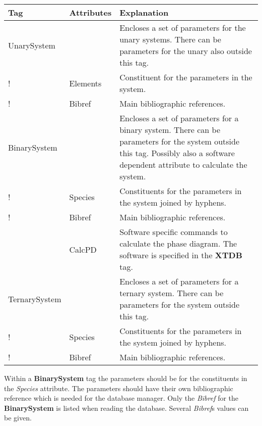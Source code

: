 \documentclass{article}
\begin{document}
\bigskip
\begin{tabular}{|p{} p{} p{}|}\hline
  Tag & Attributes &  Explanation\\\hline

  UnarySystem  && Encloses a set of parameters for the unary systems.
          There can be parameters for the unary also outside this tag.\\
!          & Elements & Constituent for the parameters in the system.\\
!          & Bibref & Main bibliographic references.\\\hline

  BinarySystem  && Encloses a set of parameters for a binary system.
          There can be parameters for the system outside this tag.  Possibly
          also a software dependent attribute to calculate the system.\\
!          & Species & Constituents for the parameters in the system joined
                       by hyphens.\\
!          & Bibref & Main bibliographic references.\\
          & CalcPD & Software specific commands to calculate the
                       phase diagram.  The software is specified in the
                       {\bf XTDB} tag.\\\hline

  TernarySystem  && Encloses a set of parameters for a ternary system.
          There can be parameters for the system outside this tag.\\
!          & Species & Constituents for the parameters in the system joined
                       by hyphens.\\
!          & Bibref & Main bibliographic references.\\\hline
\end{tabular}

\bigskip
Within a {\bf BinarySystem} tag the parameters should be for the
constituents in the {\em Species} attribute.  The parameters should
have their own bibliographic reference which is needed for the
database manager.  Only the {\em Bibref} for the {\bf BinarySystem} is
listed when reading the database.  Several {\em Bibref}s values can be
given.
\end{document}
